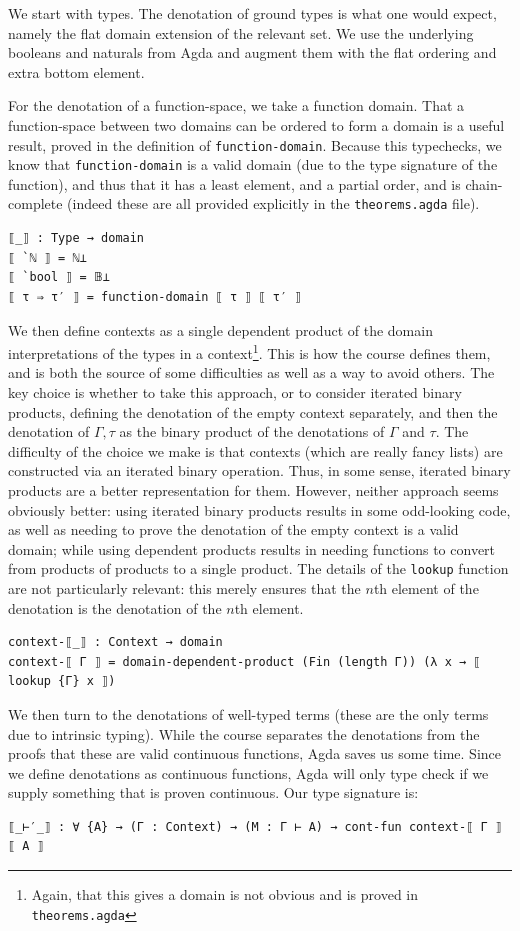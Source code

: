 \documentclass[12pt,a4paper,twoside,openright]{report}
\begin{document}
We start with types. The denotation of ground types is what one would expect, namely the flat domain extension of the relevant set. We use the underlying booleans and naturals from Agda and augment them with the flat ordering and extra bottom element. 

For the denotation of a function-space, we take a function domain. That a function-space between two domains can be ordered to form a domain is a useful result, proved in the definition of \texttt{function-domain}. Because this typechecks, we know that \texttt{function-domain} is a valid domain (due to the type signature of the function), and thus that it has a least element, and a partial order, and is chain-complete (indeed these are all provided explicitly in the \texttt{theorems.agda} file). 
\begin{verbatim}
⟦_⟧ : Type → domain
⟦ `ℕ ⟧ = ℕ⊥
⟦ `bool ⟧ = 𝔹⊥
⟦ τ ⇒ τ′ ⟧ = function-domain ⟦ τ ⟧ ⟦ τ′ ⟧
\end{verbatim}
We then define contexts as a single dependent product of the domain interpretations of the types in a context\footnote{Again, that this gives a domain is not obvious and is proved in \texttt{theorems.agda} }. This is how the course defines them, and is both the source of some difficulties as well as a way to avoid others. The key choice is whether to take this approach, or to consider iterated binary products, defining the denotation of the empty context separately, and then the denotation of $\Gamma, \tau$ as the binary product of the denotations of $\Gamma$ and $\tau$. The difficulty of the choice we make is that contexts (which are really fancy lists) are constructed via an iterated binary operation. Thus, in some sense, iterated binary products are a better representation for them. However, neither approach seems obviously better: using iterated binary products results in some odd-looking code, as well as needing to prove the denotation of the empty context is a valid domain; while using dependent products results in needing functions to convert from products of products to a single product. The details of the \texttt{lookup} function are not particularly relevant: this merely ensures that the $n$th element of the denotation is the denotation of the $n$th element. 
\begin{verbatim}
context-⟦_⟧ : Context → domain
context-⟦ Γ ⟧ = domain-dependent-product (Fin (length Γ)) (λ x → ⟦ lookup {Γ} x ⟧)
\end{verbatim}
We then turn to the denotations of well-typed terms (these are the only terms due to intrinsic typing). While the course separates the denotations from the proofs that these are valid continuous functions, Agda saves us some time. Since we define denotations as continuous functions, Agda will only type check if we supply something that is proven continuous. Our type signature is:
\begin{verbatim}
⟦_⊢′_⟧ : ∀ {A} → (Γ : Context) → (M : Γ ⊢ A) → cont-fun context-⟦ Γ ⟧ ⟦ A ⟧
\end{verbatim}
\end{document}
